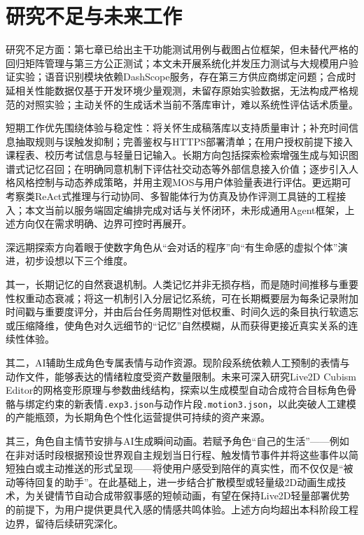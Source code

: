 \documentclass{base}
\begin{document}
\section{研究不足与未来工作}

研究不足方面：第七章已给出主干功能测试用例与截图占位框架，但未替代严格的回归矩阵管理与第三方公正测试；本文未开展系统化并发压力测试与大规模用户验证实验；语音识别模块依赖DashScope服务，存在第三方供应商绑定问题；合成时延相关性能数据仅基于开发环境少量观测，未留存原始实验数据，无法构成严格规范的对照实验；主动关怀的生成话术当前不落库审计，难以系统性评估话术质量。

短期工作优先围绕体验与稳定性：将关怀生成稿落库以支持质量审计；补充时间信息抽取规则与误触发抑制；完善鉴权与HTTPS部署清单；在用户授权前提下接入课程表、校历考试信息与轻量日记输入。长期方向包括探索检索增强生成与知识图谱式记忆召回\cite{Lewis2020}；在明确同意机制下评估社交动态等外部信息接入价值；逐步引入人格风格控制与动态养成策略，并用主观MOS与用户体验量表进行评估。更远期可考察类ReAct式推理与行动协同、多智能体行为仿真及协作评测工具链的工程接入；本文当前以服务端固定编排完成对话与关怀闭环，未形成通用Agent框架，上述方向仅在需求明确、边界可控时再展开。

深远期探索方向着眼于使数字角色从``会对话的程序''向``有生命感的虚拟个体''演进，初步设想以下三个维度。

其一，长期记忆的自然衰退机制。人类记忆并非无损存档，而是随时间推移与重要性权重动态衰减；将这一机制引入分层记忆系统，可在长期概要层为每条记录附加时间戳与重要度评分，并由后台任务周期性对低权重、时间久远的条目执行软遗忘或压缩降维，使角色对久远细节的``记忆''自然模糊，从而获得更接近真实关系的连续性体验。

其二，AI辅助生成角色专属表情与动作资源。现阶段系统依赖人工预制的表情与动作文件，能够表达的情绪粒度受资产数量限制。未来可深入研究Live2D Cubism Editor的网格变形原理与参数曲线结构，探索以生成模型自动合成符合目标角色骨骼与绑定约束的新表情\texttt{.exp3.json}与动作片段\texttt{.motion3.json}，以此突破人工建模的产能瓶颈，为长期角色个性化运营提供可持续的资产来源。

其三，角色自主情节安排与AI生成瞬间动画。若赋予角色``自己的生活''——例如在非对话时段根据预设世界观自主规划当日行程、触发情节事件并将这些事件以简短独白或主动推送的形式呈现——将使用户感受到陪伴的真实性，而不仅仅是``被动等待回复的助手''。在此基础上，进一步结合扩散模型或轻量级2D动画生成技术，为关键情节自动合成带叙事感的短帧动画，有望在保持Live2D轻量部署优势的前提下，为用户提供更具代入感的情感共鸣体验。上述方向均超出本科阶段工程边界，留待后续研究深化。
\end{document}
